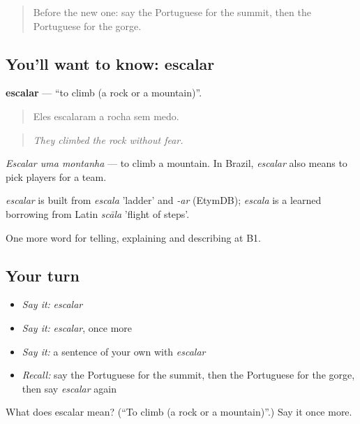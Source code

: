 \label{lesson:PT-C458-escalar}



\begin{quote}
Before the new one: say the Portuguese for the summit, then the Portuguese for the gorge.
\end{quote}

\subsection*{You'll want to know: escalar}
\textbf{escalar} — \textquotedblleft{}to climb (a rock or a mountain)\textquotedblright{}.

\begin{quote}
Eles escalaram a rocha sem medo.
\end{quote}

\begin{quote}
\emph{They climbed the rock without fear.}
\end{quote}

\emph{Escalar uma montanha} — to climb a mountain. In Brazil, \emph{escalar} also means to pick players for a team.

\begin{cousinweb}
\emph{escalar} is built from \emph{escala} 'ladder' and \emph{-ar} (EtymDB); \emph{escala} is a learned borrowing from Latin \emph{scāla} 'flight of steps'.
\end{cousinweb}

\begin{grammarlens}[title={What you've built}]
One more word for telling, explaining and describing at B1.
\end{grammarlens}

\subsection*{Your turn}
\begin{itemize}
\raggedright
  \item \emph{Say it:} \emph{escalar}
  \item \emph{Say it:} \emph{escalar}, once more
  \item \emph{Say it:} a sentence of your own with \emph{escalar}
  \item \emph{Recall:} say the Portuguese for the summit, then the Portuguese for the gorge, then say \emph{escalar} again
\end{itemize}

\begin{tcolorbox}[breakable,colback=teal!4,colframe=teal!35!black,title={Before you move on}]
What does escalar mean? (\textquotedblleft{}To climb (a rock or a mountain)\textquotedblright{}.) Say it once more.
\end{tcolorbox}
